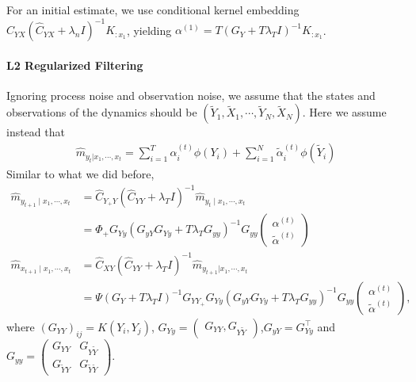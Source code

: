 \documentclass[a4paper]{article}
\newcommand{\T}{\intercal}
\begin{document}
For an initial estimate, we use conditional kernel embedding $\widehat{C}_{YX}(\widehat{C}_{YX} + \lambda_n I)^{-1} K_{:x_1}$, yielding $\alpha^{(1)} = T(G_Y + T\lambda_T I)^{-1}K_{:x_1}$.

\paragraph{L2 Regularized Filtering}
Ignoring process noise and observation noise, we assume that the states and observations of the dynamics should be $(\tilde{Y}_1,\tilde{X}_1,\cdots,\tilde{Y}_N,\tilde{X}_N)$. Here we assume instead that 
\begin{align}
\hat{m}_{y_t|x_1,\cdots,x_t} = \sum_{i=1}^T \alpha_i^{(t)} \phi(Y_i) + \sum_{i=1}^N \tilde{\alpha}_i^{(t)} \phi(\tilde{Y}_i)
\end{align}
Similar to what we did before,
\begin{align}
\hat{m}_{y_{t+1}\mid x_1,\cdots,x_t} &= \hat{C}_{Y_{+}Y}(\hat{C}_{YY}+\lambda_T I)^{-1}\hat{m}_{y_t\mid x_1,\cdots,x_t} \\
&= \Phi_{+}G_{Yy}(G_{yY}G_{Yy} + T\lambda_T G_{yy})^{-1}G_{yy} \begin{pmatrix}
\alpha^{(t)}\\
\tilde{\alpha}^{(t)}
\end{pmatrix}\\
\hat{m}_{x_{t+1}\mid x_1,\cdots,x_t} &= \hat{C}_{XY}(\hat{C}_{YY} + \lambda_{T}I)^{-1}\hat{m}_{y_{t+1}|x_1,\cdots,x_t} \\
&= \Psi(G_{Y} + T\lambda_T I)^{-1} G_{YY_+}G_{Yy}(G_{yY}G_{Yy} + T\lambda_T G_{yy})^{-1}G_{yy} \begin{pmatrix}
\alpha^{(t)}\\
\tilde{\alpha}^{(t)}
\end{pmatrix},
\end{align}
where $(G_{YY})_{ij} = K(Y_i,Y_j)$,
$
G_{Yy} = \begin{pmatrix}
G_{YY}, G_{Y\tilde{Y}}
\end{pmatrix}
$,$G_{yY} = G_{Yy}^\T$ and $G_{yy} = \begin{pmatrix}
G_{YY} & G_{Y\tilde{Y}}\\
G_{\tilde{Y}Y} & G_{\tilde{Y}\tilde{Y}}
\end{pmatrix}$.
\end{document}
